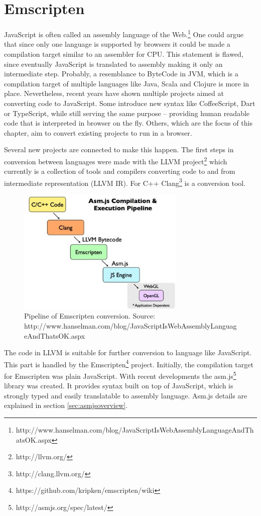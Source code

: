 \chapter{Emscripten}
\label{cha:emscripten}

JavaScript is often called an assembly language of the Web.\footnote{http://www.hanselman.com/blog/JavaScriptIsWebAssemblyLanguageAndThatsOK.aspx} One could argue that since only one language is supported by browsers it could be made a compilation target similar to an assembler for CPU. This statement is flawed, since eventually JavaScript is translated to assembly making it only an intermediate step. Probably, a resemblance to ByteCode in JVM, which is a compilation target of multiple languages like Java, Scala and Clojure is more in place.
Nevertheless, recent years have shown multiple projects aimed at converting code to JavaScript. Some introduce new syntax like CoffeeScript, Dart or TypeScript, while still serving the same purpose -- providing human readable code that is interpreted in browser on the fly. Others, which are the focus of this chapter, aim to convert existing projects to run in a browser.

Several new projects are connected to make this happen. The first steps in conversion between languages were made with the LLVM project\footnote{http://llvm.org/} which currently is a collection of tools and compilers converting code to and from intermediate representation (LLVM IR). For C++ Clang\footnote{http://clang.llvm.org/} is a conversion tool.

\begin{figure}[h!]
  \caption{Pipeline of Emscripten conversion. Source: http://www.hanselman.com/blog/JavaScriptIsWebAssemblyLanguageAndThatsOK.aspx}
  \label{img:emscriptenpipeline}
  \centering
	\includegraphics[width=8cm]{emscripten/pipeline.jpg}
\end{figure}

The code in LLVM is suitable for further conversion to language like JavaScript. This part is handled by the Emscripten\footnote{https://github.com/kripken/emscripten/wiki} project. Initially, the compilation target for Emscripten was plain JavaScript. With recent developments the asm.js\footnote{http://asmjs.org/spec/latest/} library was created. It provides syntax built on top of JavaScript, which is strongly typed and easily translatable to assembly language. Asm.js details are explained in section \ref{sec:asmjsoverview}.

